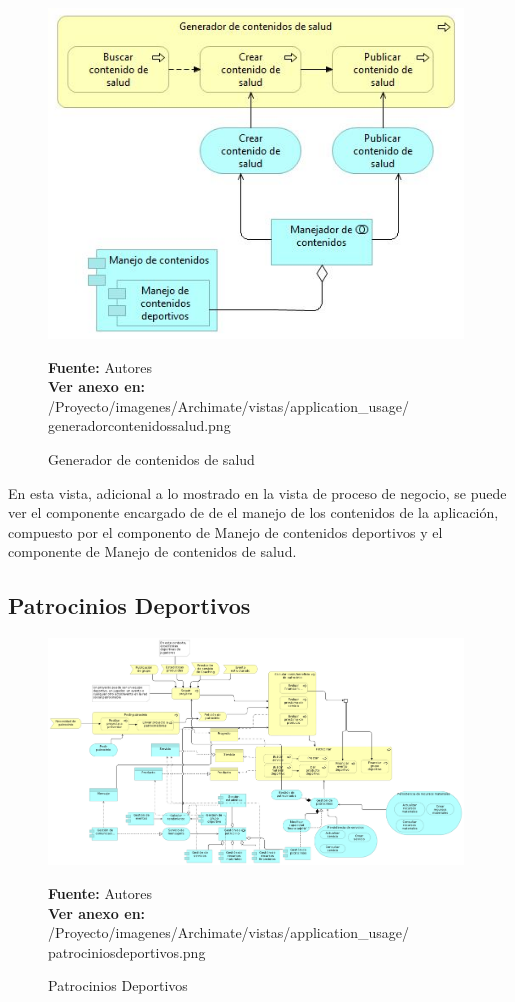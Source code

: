 \begin{figure}[!htb]
  \begin{center}
    \includegraphics[width=11cm]{./imagenes/Archimate/vistas/application_usage/generadorcontenidossalud.png}
    \caption{Generador de contenidos de salud}
    \label{fig:BP_GeneradorContenidosSalud}
    \textbf{Fuente:}  Autores \\
    \textbf{Ver anexo en:} /Proyecto/imagenes/Archimate/vistas/application\_usage/
    generadorcontenidossalud.png
  \end{center}
\end{figure}

En esta vista, adicional a lo mostrado en la vista de proceso de negocio, se puede ver el componente encargado de de el manejo de los contenidos de la aplicación, compuesto por el componento de Manejo de contenidos deportivos y el componente de Manejo de contenidos de salud.

\subsection{Patrocinios Deportivos}

\begin{figure}[!htb]
  \begin{center}
    \includegraphics[width=11cm]{./imagenes/Archimate/vistas/application_usage/patrociniosdeportivos.png}
    \caption{Patrocinios Deportivos}
    \label{fig:au_patrocinios_deportivos}
    \textbf{Fuente:}  Autores \\
    \textbf{Ver anexo en:} /Proyecto/imagenes/Archimate/vistas/application\_usage/
    patrociniosdeportivos.png
  \end{center}
\end{figure}

